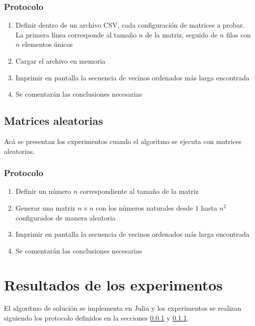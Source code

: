 \documentclass[letter]{article}
\begin{document}
\subsubsection{Protocolo} \label{experimentos:archivos:protocolo}

\begin{enumerate}
    \item Definir dentro de un archivo CSV, cada configuración de matrices a probar. La primera línea corresponde al tamaño $n$ de la matriz, seguido de $n$ filas con $n$ elementos únicos
    \item Cargar el archivo en memoria
    \item Imprimir en pantalla la secuencia de vecinos ordenados más larga encontrada
    \item Se comentarán las conclusiones necesarias
\end{enumerate}

\subsection{Matrices aleatorias} \label{experimentos:aleatorias}

Acá se presentan los experimentos cuando el algoritmo se ejecuta con matrices aleatorias. \par

\subsubsection{Protocolo} \label{experimentos:aleatorias:protocolo}

\begin{enumerate}
    \item Definir un número $n$ correspondiente al tamaño de la matriz
    \item Generar una matriz $n \times n$ con los números naturales desde $1$ hasta $n^2$ configurados de manera aleatoria
    \item Imprimir en pantalla la secuencia de vecinos ordenados más larga encontrada
    \item Se comentarán las conclusiones necesarias
\end{enumerate}

\section{Resultados de los experimentos} \label{resultados}

El algoritmo de solución se implementa en Julia y los experimentos se realizan siguiendo los protocolo definidos en la secciones \ref{experimentos:archivos:protocolo} y \ref{experimentos:aleatorias:protocolo}. \par
\end{document}
